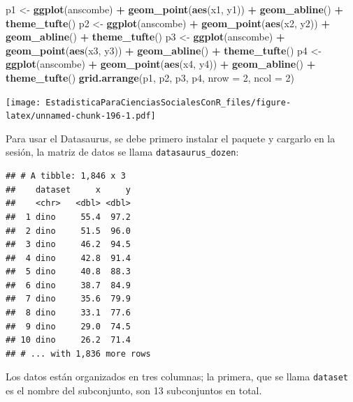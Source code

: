 \documentclass[]{book}
\newenvironment{Shaded}{\begin{snugshade}}{\end{snugshade}}
\newcommand{\DataTypeTok}[1]{\textcolor[rgb]{0.13,0.29,0.53}{#1}}
\newcommand{\DecValTok}[1]{\textcolor[rgb]{0.00,0.00,0.81}{#1}}
\newcommand{\KeywordTok}[1]{\textcolor[rgb]{0.13,0.29,0.53}{\textbf{#1}}}
\newcommand{\NormalTok}[1]{#1}
\newcommand{\OperatorTok}[1]{\textcolor[rgb]{0.81,0.36,0.00}{\textbf{#1}}}
\newcommand{\StringTok}[1]{\textcolor[rgb]{0.31,0.60,0.02}{#1}}
\begin{document}
\begin{Shaded}
\begin{Highlighting}[]
\NormalTok{p1 <-}\StringTok{ }\KeywordTok{ggplot}\NormalTok{(anscombe) }\OperatorTok{+}\StringTok{ }\KeywordTok{geom_point}\NormalTok{(}\KeywordTok{aes}\NormalTok{(x1, y1)) }\OperatorTok{+}\StringTok{ }\KeywordTok{geom_abline}\NormalTok{() }\OperatorTok{+}\StringTok{ }\KeywordTok{theme_tufte}\NormalTok{()}
\NormalTok{p2 <-}\StringTok{ }\KeywordTok{ggplot}\NormalTok{(anscombe) }\OperatorTok{+}\StringTok{ }\KeywordTok{geom_point}\NormalTok{(}\KeywordTok{aes}\NormalTok{(x2, y2)) }\OperatorTok{+}\StringTok{ }\KeywordTok{geom_abline}\NormalTok{() }\OperatorTok{+}\StringTok{ }\KeywordTok{theme_tufte}\NormalTok{()}
\NormalTok{p3 <-}\StringTok{ }\KeywordTok{ggplot}\NormalTok{(anscombe) }\OperatorTok{+}\StringTok{ }\KeywordTok{geom_point}\NormalTok{(}\KeywordTok{aes}\NormalTok{(x3, y3)) }\OperatorTok{+}\StringTok{ }\KeywordTok{geom_abline}\NormalTok{() }\OperatorTok{+}\StringTok{ }\KeywordTok{theme_tufte}\NormalTok{()}
\NormalTok{p4 <-}\StringTok{ }\KeywordTok{ggplot}\NormalTok{(anscombe) }\OperatorTok{+}\StringTok{ }\KeywordTok{geom_point}\NormalTok{(}\KeywordTok{aes}\NormalTok{(x4, y4)) }\OperatorTok{+}\StringTok{ }\KeywordTok{geom_abline}\NormalTok{() }\OperatorTok{+}\StringTok{ }\KeywordTok{theme_tufte}\NormalTok{()}
\KeywordTok{grid.arrange}\NormalTok{(p1, p2, p3, p4, }\DataTypeTok{nrow =} \DecValTok{2}\NormalTok{, }\DataTypeTok{ncol =} \DecValTok{2}\NormalTok{)}
\end{Highlighting}
\end{Shaded}

\texttt{[image: EstadisticaParaCienciasSocialesConR\_files/figure-latex/unnamed-chunk-196-1.pdf]}

Para usar el Datasaurus, se debe primero instalar el paquete y cargarlo en la sesión, la matriz de datos se llama \texttt{datasaurus\_dozen}:

\begin{verbatim}
## # A tibble: 1,846 x 3
##    dataset     x     y
##    <chr>   <dbl> <dbl>
##  1 dino     55.4  97.2
##  2 dino     51.5  96.0
##  3 dino     46.2  94.5
##  4 dino     42.8  91.4
##  5 dino     40.8  88.3
##  6 dino     38.7  84.9
##  7 dino     35.6  79.9
##  8 dino     33.1  77.6
##  9 dino     29.0  74.5
## 10 dino     26.2  71.4
## # ... with 1,836 more rows
\end{verbatim}

Los datos están organizados en tres columnas; la primera, que se llama \texttt{dataset} es el nombre del subconjunto, son 13 subconjuntos en total.
\end{document}
